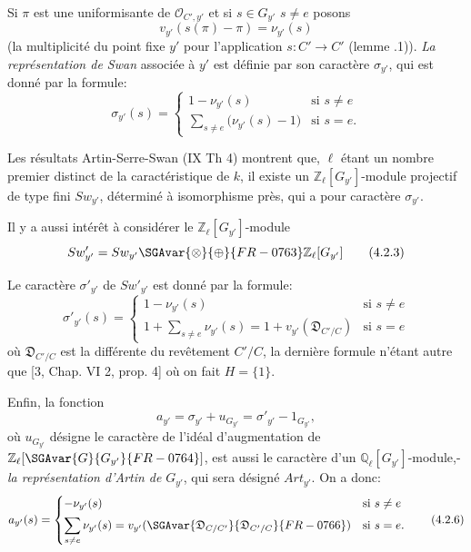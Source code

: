 Si $\pi$ est une uniformisante de $\mathcal{O}_{C',y'}$ et si $s\in G_{y'}$ $s\ne e$ posons
\[
v_{y'}(s(\pi)-\pi)=\nu_{y'}(s)
\tag{4.2.1}
\]
(la multiplicité du point fixe $y'$ pour l'application $s:C'\to C'$ (lemme .1)).
\emph{La représentation de Swan} associée à $y'$ est définie par son caractère $\sigma_{y'}$, qui est donné par la formule:
\[
\sigma_{y'}(s)=
\begin{cases}
1-\nu_{y'}(s)& \text{si } s\ne e\\[0.4em]
\displaystyle\sum_{s\ne e}\bigl(\nu_{y'}(s)-1\bigr)& \text{si } s=e.
\end{cases}
\tag{4.2.2}
\]

Les résultats Artin-Serre-Swan (IX Th 4) montrent que, $\ell$ étant un nombre premier distinct de la caractéristique de $k$, il existe un $\mathbb{Z}_\ell[G_{y'}]$-module projectif de type fini $Sw_{y'}$, déterminé à isomorphisme près, qui a pour caractère $\sigma_{y'}$.

Il y a aussi intérêt à considérer le $\mathbb{Z}_\ell[G_{y'}]$-module
\[
Sw'_{y'}=Sw_{y'}\SGAvar{\otimes}{\oplus}{FR-0763}\mathbb{Z}_\ell[G_{y'}]
\tag{4.2.3}
\]

Le caractère $\sigma'_{y'}$ de $Sw'_{y'}$ est donné par la formule:
\[
\sigma'_{y'}(s)=
\begin{cases}
1-\nu_{y'}(s)& \text{si } s\ne e\\[0.4em]
\displaystyle 1+\sum_{s\ne e}\nu_{y'}(s)
=1+v_{y'}(\mathfrak{D}_{C'/C})& \text{si } s=e
\end{cases}
\tag{4.2.4}
\]
où $\mathfrak{D}_{C'/C}$ est la différente du
revêtement $C'/C$, la dernière formule n'étant autre que [3, Chap. VI 2, prop. 4] où on fait $H=\{1\}$.

Enfin, la fonction
\[
a_{y'}=\sigma_{y'}+u_{G_{y'}}=\sigma'_{y'}-1_{G_{y'}},
\tag{4.2.5}
\]
où $u_{G_{y'}}$ désigne le caractère de l'idéal d'augmentation de $\mathbb{Z}_\ell[\SGAvar{G}{G_{y'}}{FR-0764}]$, est aussi le caractère d'un $\mathbb{Q}_\ell[G_{y'}]$-module,- \emph{la représentation d'Artin de} $G_{y'}$, qui sera désigné  $Art_{y'}$.
On a donc:
\[
a_{y'}(s)=
\begin{cases}
-\nu_{y'}(s)& \text{si } s\ne e\\[0.4em]
\displaystyle\sum_{s\ne e}\nu_{y'}(s)=v_{y'}(\SGAvar{\mathfrak{D}_{C/C'}}{\mathfrak{D}_{C'/C}}{FR-0766})& \text{si } s=e.
\end{cases}
\tag{4.2.6}
\]

